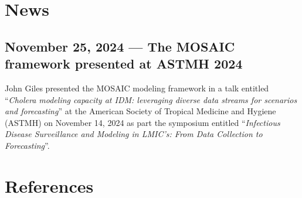 \documentclass[
]{book}
\begin{document}
\chapter{News}\label{news}

\section*{November 25, 2024 --- The MOSAIC framework presented at ASTMH 2024}\label{november-25-2024-the-mosaic-framework-presented-at-astmh-2024}

John Giles presented the MOSAIC modeling framework in a talk entitled ``\emph{Cholera modeling capacity at IDM:
leveraging diverse data streams for scenarios and forecasting}'' at the American Society of Tropical Medicine and Hygiene (ASTMH) on November 14, 2024 as part the symposium entitled ``\emph{Infectious Disease Surveillance and Modeling in LMIC's: From Data Collection to Forecasting}''.

\chapter{References}\label{references}

\nocite{*}

\end{document}

